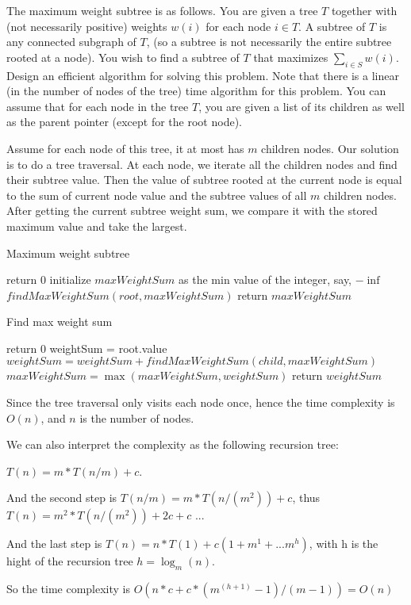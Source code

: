 \newpage
{} %

\problemdes

The maximum weight subtree is as follows. You are given a tree $T$ together with (not necessarily positive) weights $w(i)$ for each node $i \in T$. A subtree of $T$ is any connected subgraph of $T$, (so a subtree is not necessarily the entire subtree rooted at a node). You wish to find a subtree of $T$ that maximizes $\sum_{i \in S} w(i)$. Design an efficient algorithm for solving this problem. Note that there is a linear (in the number of nodes of the tree) time algorithm for this problem. You can assume that for each node in the tree $T$, you are given a list of its children as well as the parent pointer (except for the root node).

\solution


Assume for each node of this tree, it at most has $m$ children nodes. Our solution is to do a tree traversal. At each node, we iterate all the children nodes and find their subtree value. Then the value of subtree rooted at the current node is equal to the sum of current node value and the subtree values of all $m$ children nodes. After getting the current subtree weight sum, we compare it with the stored maximum value and take the largest.


\begin{algorithm}[]
  \caption{Maximum weight subtree}
  {
  	return $0$\;
  }
  initialize $maxWeightSum$ as the min value of the integer, say, $-\inf$\;
  $findMaxWeightSum(root, maxWeightSum)$\;
  return $maxWeightSum$\;
\end{algorithm}

\begin{algorithm}[]
  \caption{Find max weight sum}
  {
  	return $0$\;
  }
  weightSum = root.value\;
  {
  	$weightSum = weightSum + findMaxWeightSum(child, maxWeightSum)$
  }
  $maxWeightSum = \max(maxWeightSum, weightSum)$
  return $weightSum$\;
\end{algorithm}




Since the tree traversal only visits each node once, hence the time complexity is $O(n)$, and $n$ is the number of nodes.

We can also interpret the complexity as the following recursion tree: 

$T(n) = m*T(n/m)+ c$.

And the second step is $T(n/m) = m*T(n/(m^2)) + c$, thus $T(n) = m^2*T(n/(m^2)) + 2c + c$ ...

And the last step is $T(n) = n*T(1) + c(1+m^1+...m^h)$, with h is the hight of the recursion tree $h = \log_m(n)$.

So the time complexity is $O(n*c + c*(m^(h+1)-1)/(m-1)) = O(n)$


